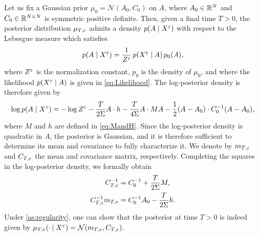 \documentclass[review,onefignum,onetabnum]{siamonline190516}
\begin{document}
Let us fix a Gaussian prior $\mu_0 = \mathcal N(A_0, C_0)$ on $A$, where $A_0 \in \mathbb{R}^N$ and $C_0 \in \mathbb{R}^{N\times N}$ is symmetric positive definite. Then, given a final time $T > 0$, the posterior distribution $\mu_{T,\varepsilon}$ admits a density $p(A \mid X^\varepsilon)$ with respect to the Lebesgue measure which satisfies
\begin{equation}
p(A \mid X^\varepsilon) = \frac1{Z^\varepsilon} \, p(X^\varepsilon \mid A) \, p_0(A),
\end{equation}
where $Z^\varepsilon$ is the normalization constant, $p_0$ is the density of $\mu_0$, and where the likelihood $p(X^\varepsilon \mid A)$ is given in \eqref{eq:Likelihood}. The log-posterior density is therefore given by
\begin{equation}\label{eq:Posterior}
\log p(A \mid X^\epl) = -\log Z^\epl - \frac{T}{2\Sigma} A \cdot h - \frac{T}{4\Sigma} A \cdot M A - \frac12 (A - A_0) \cdot C_0^{-1}(A-A_0),
\end{equation}
where $M$ and $h$ are defined in \eqref{eq:MandH}.
Since the log-posterior density is quadratic in $A$, the posterior is Gaussian, and it is therefore sufficient to determine its mean and covariance to fully characterize it. We denote by $m_{T,\varepsilon}$ and $C_{T,\varepsilon}$ the mean and covariance matrix, respectively. Completing the squares in the log-posterior density, we formally obtain
\begin{equation}
\begin{aligned}
C_{T,\varepsilon}^{-1} &= C_0^{-1} + \frac{T}{2\Sigma} M, \\
C_{T,\varepsilon}^{-1}m_{T,\varepsilon} &= C_0^{-1}A_0 - \frac{T}{2\Sigma} h. 
\end{aligned}
\end{equation}
Under \cref{as:regularity}, one can show that the posterior at time $T > 0$ is indeed given by $\mu_{T,\varepsilon}(\cdotp\mid X^\varepsilon) = \mathcal N(m_{T,\varepsilon}, C_{T,\varepsilon})$. 
\end{document}
